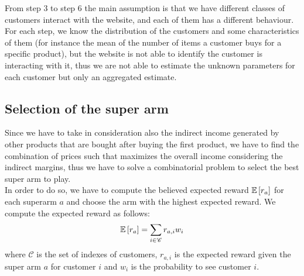 From step 3 to step 6 the main assumption is that we have different classes of customers interact with the website, and each of them has a different behaviour. For each step, we know the distribution of the customers and some characteristics of them (for instance the mean of the number of items a customer buys for a specific product), but the website is not able to identify the customer is interacting with it, thus we are not able to estimate the unknown parameters for each customer but only an aggregated estimate.

\subsection{Selection of the super arm}
Since we have to take in consideration also the indirect income generated by other products that are bought after buying the first product, we have to find the combination of prices such that maximizes the overall income considering the indirect margins, thus we have to solve a combinatorial problem to select the best super arm to play.\\
In order to do so, we have to compute the believed expected reward $\operatorname{\mathbb{E}}\left[ r_a\right]$ for each superarm $a$ and choose the arm with the highest expected reward. We compute the expected reward as follows:
\begin{align*}
    \operatorname{\mathbb{E}}\left[ r_a\right] = \sum_{i \in \mathcal{C}} r_{a,i} w_i
\end{align*}
where $\mathcal{C}$ is the set of indexes of customers, $r_{a,i}$ is the expected reward given the super arm $a$ for customer $i$ and $w_i$ is the probability to see customer $i$.\\

